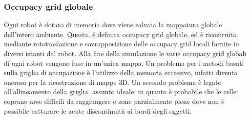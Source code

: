 \subsubsection{Occupacy grid globale}
\label{ssec:globaloccgrid}
Ogni robot è dotato di memoria dove viene salvata la mappatura globale 
dell'intero ambiente. Questa, è definita occupacy grid globale, ed è ricostruita 
mediante rototraslazione e sovrapposizione delle occupacy grid locali 
fornite in diversi istanti dal robot.
Alla fine della simulazione le varie occupacy grid globali di ogni robot vengono
fuse in un'unica mappa.
Un problema per i metodi basati sulla griglia di occupazione è l'utilizzo della
memoria eccessivo, infatti diventa oneroso per la ricostruzione di mappe 3D. 
Un secondo problema è legato all'allineamento della griglia, assunto ideale, in
quanto è probabile che le celle: coprano aree difficili da raggiungere e zone 
parzialmente piene dove non è possibile catturare le acute discontinuità ai 
bordi degli oggetti. 
